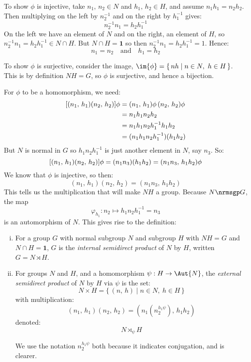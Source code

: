 To show \(\phi\) is injective, take \(n_1,\, n_2 \in N\) and \(h_1,\, h_2 \in H\), and assume \(n_1 h_1 = n_2 h_2\).
Then multiplying on the left by \(n_2^{-1}\) and on the right by \(h_1^{-1}\) gives:
\[n_2^{-1} n_1 = h_2 h_1^{-1}\]
On the left we have an element of \(N\) and on the right, an element of \(H\), so \(n_2^{-1} n_1 = h_2 h_1^{-1} \in N
\cap H\).
But \(N \cap H = \bm{1}\) so then \(n_2^{-1} n_1 = h_2 h_1^{-1} = 1\).
Hence:
\[n_1 = n_2 \quad \text{and} \quad h_1 = h_2\]

To show \(\phi\) is surjective, consider the image, \(\im{\phi} = \{\,nh \mid n \in N,\ h \in H\,\}\).
This is by definition \(NH = G\), so \(\phi\) is surjective, and hence a bijection.

For \(\phi\) to be a homomorphism, we need:
\begin{equation*}
\begin{aligned}
    \relax[(n_1,\,h_1)(n_2,\,h_2)]\phi &= (n_1,\,h_1)\phi\,(n_2,\,h_2)\phi \\
    &= n_1 h_1 n_2 h_2 \\
    &= n_1 h_1 n_2 h_1^{-1} h_1 h_2 \\
    &= (n_1 h_1 n_2 h_1^{-1})(h_1 h_2)
\end{aligned}
\end{equation*}
But \(N\) is normal in \(G\) so \(h_1 n_2 h_1^{-1}\) is just another element in \(N\), say \(n_3\).
So:
\[\relax[(n_1,\,h_1)(n_2,\,h_2)]\phi = (n_1 n_3)(h_1 h_2) = (n_1 n_3,\,h_1 h_2)\phi\]
We know that \(\phi\) is injective, so then:
\[(n_1,\,h_1)(n_2,\,h_2) = (n_1 n_3,\,h_1 h_2)\]
This tells us the multiplication that will make \(NH\) a group.
Because \(N \nrmsgp G\), the map
\[\varphi_{h_1}:n_2 \mapsto h_1 n_2 h_1^{-1} = n_3\]
is an automorphism of \(N\).
This gives rise to the definition:

\begin{definition}
\mbox{}
\begin{enumerate}[(i)]
    \item

        For a group \(G\) with normal subgroup \(N\) and subgroup \(H\) with \(NH = G\) and \(N \cap H = \bm{1}\),
        \(G\) is the \emph{internal semidirect product} of \(N\) by \(H\), written \(G = N \rtimes H\).

    \item

        For groups \(N\) and \(H\), and a homomorphism \(\psi:H \to \Aut{N}\), the \emph{external semidirect product} of
        \(N\) by \(H\) via \(\psi\) is the set:
        \[N \times H = \{\,(n,\,h) \mid n \in N,\ h \in H\,\}\]
        with multiplication:
        \[(n_1,\,h_1)(n_2,\,h_2) = (n_1(n_2^{h_1\psi}),\,h_1 h_2)\]
        denoted:
        \[N \rtimes_{\psi} H\]

        We use the notation \(n_2^{h_1\psi}\) both because it indicates conjugation, and is clearer.

\end{enumerate}
\end{definition}

